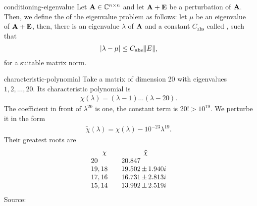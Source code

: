 \begin{Definition}{conditioning-eigenvalue}
  Let $\mathbf A\in\mathbb C^{n\times n}$ and let $\mathbf A+\mathbf E$ be a perturbation of $\mathbf A$. Then, we define the  of the eigenvalue problem as follows: let $\mu$ be an eigenvalue of $\mathbf A+\mathbf E$, then, there is an eigenvalue $\lambda$ of $\mathbf A$ and a constant $C_{\text{abs}}$ called , such that
  \begin{gather*}
    \lvert\lambda-\mu\rvert \le C_{\text{abs}} \lVert E\rVert,
  \end{gather*}
  for a suitable matrix norm.
\end{Definition}

\begin{Example}{characteristic-polynomial}
  Take a matrix of dimension 20 with eigenvalues $1,2,\ldots,20$. Its
  characteristic polynomial is
  \begin{gather}
    \chi(\lambda) = (\lambda-1)\dots(\lambda-20).
  \end{gather}
  The coefficient in front of $\lambda^{20}$ is one, the constant term is $20! > 10^{19}$.
  We perturbe it in the form
  \begin{gather}
    \tilde \chi(\lambda) = \chi(\lambda) - 10^{-23}\lambda^{19}.
  \end{gather}
  Their greatest roots are
  \begin{gather}
    \begin{array}{l@{\qquad}l@{\,}c@{\,}l}
      \multicolumn{1}{c}{\chi}&
      \multicolumn{3}{c}{\tilde \chi}\\
      20&20.847\\
      19,18&19.502&\pm&1.940i\\
      17,16&16.731&\pm&2.813i\\
      15,14&13.992&\pm&2.519i\\
    \end{array}
  \end{gather}
  {\tiny Source: \cite{DeuflhardHohmann08}}
\end{Example}

